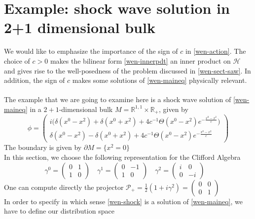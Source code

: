 \section{Example: shock wave solution in 2+1 dimensional bulk}
We would like to emphasize the importance of the sign of $c$ in \cref{wen-action}. 
The choice of $c>0$ makes the bilinear form \cref{wen-innerpdt} an inner product on $\mathcal{H}$ and gives rise to the well-posedness of the problem discussed in \cref{wen-sect-saw}.
In addition, the sign of $c$ makes some solutions of \cref{wen-maineq} physically relevant. \\\\
The example that we are going to examine here is a shock wave solution of \cref{wen-maineq} in a $2+1$-dimensional bulk $M = \mathbb{R}^{1,1}\times\mathbb{R}_+$, given by
\begin{equation}\label{wen-shock}
\phi = \begin{pmatrix}
i \big(\delta(x^0 - x^2) + \delta(x^0 + x^2) + 4c^{-1}\Theta(x^0-x^2)e^{- \frac{x^0-x^2}{c}} \big) \\
\delta({x^0 - x^2}) - \delta(x^0 + x^2) + 4c^{-1}\Theta(x^0-x^2)e^{- \frac{x^0-x^2}{c}} \end{pmatrix}
\end{equation}
The boundary is given by $\partial M = \{x^2 = 0\}$ \\
In this section, we choose the following representation for the Clifford Algebra
\begin{equation*}
\gamma^0 = \begin{pmatrix} 0 & 1 \\ 1 &0 \end{pmatrix} \quad
\gamma^1 = \begin{pmatrix} 0 & -1 \\ 1 &0 \end{pmatrix} \quad
\gamma^2 = \begin{pmatrix} i & 0 \\ 0 &-i \end{pmatrix} \quad
\end{equation*}
One can compute directly the projector $\mathcal{P}_+ = \frac{1}{2}(1+i\gamma^2) 
= \begin{pmatrix}0 & 0 \\ 0 & 1 \end{pmatrix}$ \\
In order to specify in which sense \cref{wen-shock} is a solution of \cref{wen-maineq}, we have to define our distribution space
